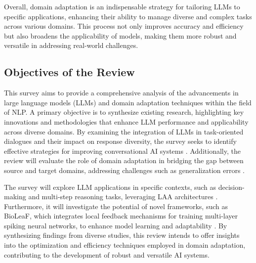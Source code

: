 Overall, domain adaptation is an indispensable strategy for tailoring LLMs to specific applications, enhancing their ability to manage diverse and complex tasks across various domains. This process not only improves accuracy and efficiency but also broadens the applicability of models, making them more robust and versatile in addressing real-world challenges.



\subsection{Objectives of the Review} \label{subsec:Objectives of the Review}



This survey aims to provide a comprehensive analysis of the advancements in large language models (LLMs) and domain adaptation techniques within the field of NLP. A primary objective is to synthesize existing research, highlighting key innovations and methodologies that enhance LLM performance and applicability across diverse domains. By examining the integration of LLMs in task-oriented dialogues and their impact on response diversity, the survey seeks to identify effective strategies for improving conversational AI systems \cite{stricker2024enhancingtaskorienteddialogueschitchat}. Additionally, the review will evaluate the role of domain adaptation in bridging the gap between source and target domains, addressing challenges such as generalization errors \cite{zhao2017multiplesourcedomainadaptation}.



The survey will explore LLM applications in specific contexts, such as decision-making and multi-step reasoning tasks, leveraging LAA architectures \cite{liu2023bolaabenchmarkingorchestratingllmaugmented}. Furthermore, it will investigate the potential of novel frameworks, such as BioLeaF, which integrates local feedback mechanisms for training multi-layer spiking neural networks, to enhance model learning and adaptability \cite{yang2021bioleafbioplausiblelearningframework}. By synthesizing findings from diverse studies, this review intends to offer insights into the optimization and efficiency techniques employed in domain adaptation, contributing to the development of robust and versatile AI systems.



